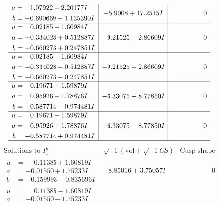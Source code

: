 \documentclass[1p]{elsarticle_modified}
\theoremstyle{definition}
\newcommand{\I}{\sqrt{-1}}
\begin{document}
$$\begin{array}{c|c|c}
\begin{aligned}
a &= \phantom{-}1.07922 - 2.20177 I \\
b &= -0.690669 - 1.135390 I\end{aligned}
 & -5.9008 + 17.2515 I & \phantom{-0.000000 } 0 \\ \hline\begin{aligned}
u &= \phantom{-}0.02185 + 1.60984 I \\
a &= -0.334028 + 0.512887 I \\
b &= -0.660273 + 0.247851 I\end{aligned}
 & -9.21525 + 2.86609 I & \phantom{-0.000000 } 0 \\ \hline\begin{aligned}
u &= \phantom{-}0.02185 - 1.60984 I \\
a &= -0.334028 - 0.512887 I \\
b &= -0.660273 - 0.247851 I\end{aligned}
 & -9.21525 - 2.86609 I & \phantom{-0.000000 } 0 \\ \hline\begin{aligned}
u &= \phantom{-}0.19671 + 1.59879 I \\
a &= \phantom{-}0.95926 - 1.78876 I \\
b &= -0.587714 - 0.974481 I\end{aligned}
 & -6.33075 + 8.77850 I & \phantom{-0.000000 } 0 \\ \hline\begin{aligned}
u &= \phantom{-}0.19671 - 1.59879 I \\
a &= \phantom{-}0.95926 + 1.78876 I \\
b &= -0.587714 + 0.974481 I\end{aligned}
 & -6.33075 - 8.77850 I & \phantom{-0.000000 } 0\\
 \hline 
 \end{array}$$\newpage$$\begin{array}{c|c|c}  
\text{Solutions to }I^u_{1}& \I (\text{vol} + \sqrt{-1}CS) & \text{Cusp shape}\\
 \hline 
\begin{aligned}
u &= \phantom{-}0.11385 + 1.60819 I \\
a &= -0.01550 + 1.75233 I \\
b &= -0.159993 + 0.835696 I\end{aligned}
 & -8.85016 + 3.75057 I & \phantom{-0.000000 } 0 \\ \hline\begin{aligned}
u &= \phantom{-}0.11385 - 1.60819 I \\
a &= -0.01550 - 1.75233 I \\

\end{aligned}
\end{array}$$
\end{document}
